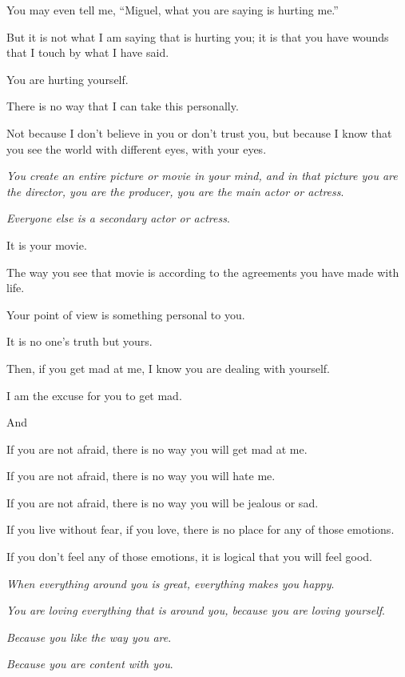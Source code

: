 \documentclass{article}
\numberwithin{equation}{section}
\begin{document}
%
You may even tell me, ``Miguel, what you are saying is hurting me.''

But it is not what I am saying that is hurting you; it is that you have wounds that I touch by what I have said.

You are hurting yourself.

There is no way that I can take this personally.

Not because I don't believe in you or don't trust you, but because I know that you see the world with different eyes, with your eyes.

\textit{You create an entire picture or movie in your mind, and in that picture you are the director, you are the producer, you are the main actor or actress}.

\textit{Everyone else is a secondary actor or actress}.

It is your movie.

%
The way you see that movie is according to the agreements you have made with life.

Your point of view is something personal to you.

It is no one's truth but yours.

Then, if you get mad at me, I know you are dealing with yourself.

I am the excuse for you to get mad.

And 

If you are not afraid, there is no way you will get mad at me.

If you are not afraid, there is no way you will hate me.

If you are not afraid, there is no way you will be jealous or sad.

%
If you live without fear, if you love, there is no place for any of those emotions.

If you don't feel any of those emotions, it is logical that you will feel good.


\textit{When everything around you is great, everything makes you happy}.

\textit{You are loving everything that is around you, because you are loving yourself}.

\textit{Because you like the way you are}.

\textit{Because you are content with you}.
\end{document}
